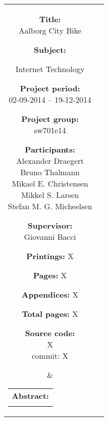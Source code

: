 \begin{titlepage}
\begin{nopagebreak}
{\begin{tabular}{cc}
	\parbox{7cm}{
	\begin{description}
		\item { \textbf{Title:}}\\
			Aalborg City Bike
    		\item { \textbf{Subject:}}\\
			\raggedright Internet Technology
		\item { \textbf{Project period:}}\\
			02-09-2014 -- 19-12-2014
 		\hspace{4cm}
		\item { \textbf{Project group:}}\\
  			sw701e14
 		\hspace{4cm}
		\item {\textbf{Participants:}}\\
			Alexander Draegert\\
			Bruno Thalmann\\
			Mikael E. Christensen\\
			Mikkel S. Larsen\\
			Stefan M. G. Micheelsen
		\item { \textbf{Supervisor:}}\\
 			Giovanni Bacci
		\item { \textbf{Printings:} X }
		\item { \textbf{Pages:} X } 
		\item { \textbf{Appendices:} X }
		\item { \textbf{Total pages:} X }
		\item { \textbf{Source code:}\\ {\small X \\ commit: X}}
	\end{description}
	\vfill } &
	\parbox{6.5cm}{
 	 \vspace{.15cm}
  	\hfill 
  	\begin{tabular}{l}
  		{ \textbf{Abstract:}}\bigskip \\
  		\fbox{
  		\parbox{8cm}{\bigskip
     		{\vfill{\footnotesize 
     		\bigskip}}
     	}}
   	\end{tabular}}
\end{tabular}
}%
\\
\vfill
\begin{center}
\end{center}
\end{nopagebreak}
\end{titlepage}